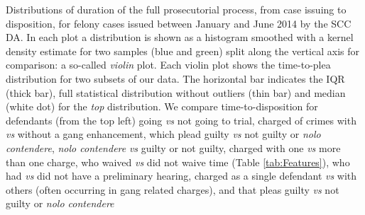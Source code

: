 Distributions of duration of the full prosecutorial process, from case issuing to disposition, for felony cases issued between January and June 2014 by the SCC DA.  In each plot a distribution is shown as a histogram smoothed with a kernel density estimate for two samples (blue and green) split along the vertical axis for comparison: a so-called {\it violin} plot. Each violin plot shows the time-to-plea distribution for two subsets of our data. The horizontal bar indicates the IQR (thick bar), full statistical distribution without outliers (thin bar) and median (white dot) for the {\it top} distribution. We compare time-to-disposition for defendants (from the top left) going {\it vs} not going to trial, charged of crimes with {\it vs} without a gang enhancement, which plead guilty {\it vs} not guilty or {\it nolo contendere}, {\it nolo contendere} {\it vs} guilty or not guilty, charged with one {\it vs} more than one charge, who waived {\it vs} did not waive time (Table \ref{tab:Features}), who had {\it vs} did not have a preliminary hearing, charged as a single defendant {\it vs} with others (often occurring in gang related charges), and that pleas guilty {\it vs} not guilty or {\it nolo contendere}
\label{fig:Violins}